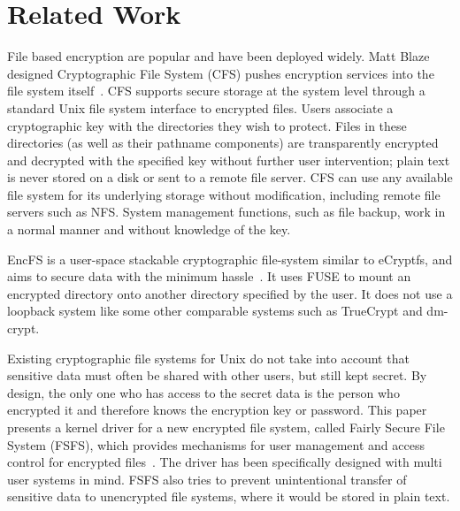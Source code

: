 \section{Related Work}
\label{related}

%
%
%
%
%
%
%

File based encryption are popular and have been deployed widely.  Matt
Blaze designed Cryptographic File System (CFS) pushes encryption
services into the file system itself~\cite{cfs}.  CFS supports secure
storage at the system level through a standard Unix file system
interface to encrypted files.  Users associate a cryptographic key
with the directories they wish to protect.  Files in these directories
(as well as their pathname components) are transparently encrypted and
decrypted with the specified key without further user intervention;
plain text is never stored on a disk or sent to a remote file server.
CFS can use any available file system for its underlying storage
without modification, including remote file servers such as NFS.
System management functions, such as file backup, work in a normal
manner and without knowledge of the key.

EncFS is a user-space stackable cryptographic file-system similar to
eCryptfs, and aims to secure data with the minimum
hassle~\cite{encfs}.  It uses FUSE to mount an encrypted directory
onto another directory specified by the user.  It does not use a
loopback system like some other comparable systems such as TrueCrypt
and dm-crypt.

Existing cryptographic file systems for Unix do not take into account
that sensitive data must often be shared with other users, but still
kept secret.  By design, the only one who has access to the secret
data is the person who encrypted it and therefore knows the encryption
key or password.  This paper presents a kernel driver for a new
encrypted file system, called Fairly Secure File System (FSFS), which
provides mechanisms for user management and access control for
encrypted files~\cite{fsfs}.  The driver has been specifically
designed with multi user systems in mind.  FSFS also tries to prevent
unintentional transfer of sensitive data to unencrypted file systems,
where it would be stored in plain text.


